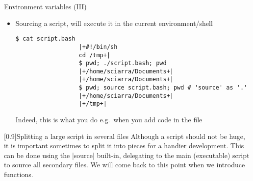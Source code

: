 \begin{frame}[fragile]{Environment variables (III)}
    \vspace{-3mm}
    \begin{itemize}
        \item Sourcing a script, will execute it in the current environment/shell
              \begin{lstlisting}[style=MyBash, numbers=none, aboveskip=2mm, belowskip=-6mm, xrightmargin=20mm]
                  $ cat script.bash
                  |+#!/bin/sh
                  cd /tmp+|
                  $ pwd; ./script.bash; pwd
                  |+/home/sciarra/Documents+|
                  |+/home/sciarra/Documents+|
                  $ pwd; source script.bash; pwd # 'source' as '.'
                  |+/home/sciarra/Documents+|
                  |+/tmp+|
              \end{lstlisting}
              Indeed, this is what you do e.g.\ when you add code in the  file
    \end{itemize}
    \begin{varblock}{}[0.9\textwidth]{Splitting a large script in several files}
        Although a script should not be huge, it is important sometimes to split it into pieces for a handier development.
        This can be done using the \bash|source| built-in, delegating to the main (executable) script to source all secondary files.
        We will come back to this point when we introduce functions.
    \end{varblock}
\end{frame}




